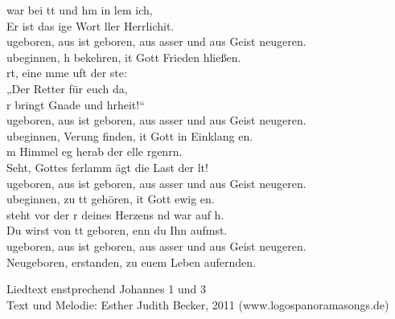 
 war bei tt und hm in lem ich,\\
Er ist das ige Wort ller Herrlichit.\\

ugeboren, aus ist geboren, aus asser und aus Geist neugeren.\\
ubeginnen, h bekehren, it Gott Frieden hließen.\\

rt, eine mme uft  der ste:\\
„Der Retter  für euch da,\\ 
r bringt Gnade und hrheit!“\\

ugeboren, aus ist geboren, aus asser und aus Geist neugeren.\\
ubeginnen, Verung finden, it Gott in Einklang en.\\

m Himmel eg herab der elle rgenrn.\\
Seht, Gottes ferlamm ägt die Last der lt!\\

ugeboren, aus ist geboren, aus asser und aus Geist neugeren.\\
ubeginnen, zu tt gehören, it Gott ewig en.\\

 steht vor der r deines Herzens nd war auf h.\\
Du wirst von tt geboren, enn du Ihn aufmst.\\

ugeboren, aus ist geboren, aus asser und aus Geist neugeren.\\
Neugeboren, erstanden, zu euem Leben aufernden.\\

\begin{footnotesize}
Liedtext enstprechend Johannes 1 und 3\\
Text und Melodie: Esther Judith Becker, 2011 (www.logospanoramasongs.de)
\end{footnotesize}